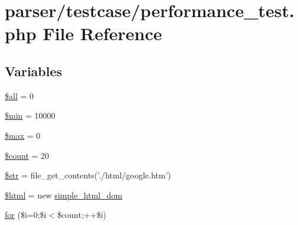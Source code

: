 \hypertarget{performance__test_8php}{\section{parser/testcase/performance\+\_\+test.php File Reference}
\label{performance__test_8php}
}
\subsection*{Variables}
\begin{DoxyCompactItemize}
\item 
\hyperlink{performance__test_8php_a3c74ea9d2348c9aba28d36e692bef2d2}{\$all} = 0
\item 
\hyperlink{performance__test_8php_a56ba76399d12529c48ecea581ecd08cf}{\$min} = 10000
\item 
\hyperlink{performance__test_8php_a9fb747ef5633c244639185a7fe54f6b0}{\$max} = 0
\item 
\hyperlink{performance__test_8php_af789423037bbc89dc7c850e761177570}{\$count} = 20
\item 
\hyperlink{performance__test_8php_a7542d95618011800c61773127fa625cf}{\$str} = file\+\_\+get\+\_\+contents('./html/google.\+htm')
\item 
\hyperlink{performance__test_8php_a6f96e7fc92441776c9d1cd3386663b40}{\$html} = new \hyperlink{classsimple__html__dom}{simple\+\_\+html\+\_\+dom}
\item 
\hyperlink{performance__test_8php_a065fe5fb0983b8ad1da651824f539ccd}{for} (\$i=0;\$i$<$\$count;++\$i)
\end{DoxyCompactItemize}


